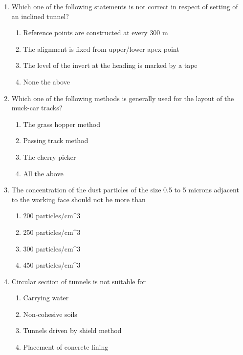 \documentclass[11pt,a4paper]{article}
\begin{document}
\begin{enumerate}
\\
\item{Which one of the following statements is not correct in respect of setting of an inclined tunnel?}
\begin{enumerate}[label=\Alph*.]
\item{Reference points are constructed at every 300 m}
\item{The alignment is fixed from upper/lower apex point}
\item{The level of the invert at the heading is marked by a tape}
\item{None the above}
\end{enumerate}
\item{Which one of the following methods is generally used for the layout of the muck-car tracks?}
\begin{enumerate}[label=\Alph*.]
\item{The grass hopper method}
\item{Passing track method}
\item{The cherry picker}
\item{All the above}
\end{enumerate}
\item{The concentration of the dust particles of the size 0.5 to 5 microns adjacent to the working face should not be more than}
\begin{enumerate}[label=\Alph*.]
\item{200 particles/cm\^{}3}
\item{250 particles/cm\^{}3}
\item{300 particles/cm\^{}3}
\item{450 particles/cm\^{}3}
\end{enumerate}
\item{Circular section of tunnels is not suitable for}
\begin{enumerate}[label=\Alph*.]
\item{Carrying water}
\item{Non-cohesive soils}
\item{Tunnels driven by shield method}
\item{Placement of concrete lining}

\end{enumerate}
\end{enumerate}
\end{document}
